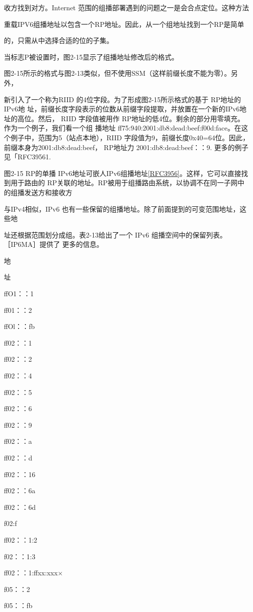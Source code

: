 收方找到对方。Internet 范围的组播部署遇到的问题之一是会合点定位。这种方法

重载IPV6组播地址以包含一个RP地址。因此，从一个组地址找到一个RP是简单

的，只需从中选择合适的位的子集。

当标志P被设置时，图2-15显示了组播地址修改后的格式。

图2-15所示的格式与图2-13类似，但不使用SSM（这样前缀长度不能为零）。另外，

新引入了一个称为RIID 的4位字段。为了形成图2-15所示格式的基于 RP地址的IPv6地
址，前缀长度字段表示的位数从前缀字段提取，并放置在一个新的IPv6地址的高位。然后，
RIID 字段值被用作 RP地址的低4位。剩余的部分用零填充。作为一个例子，我们看一个组
播地址 ff75:940:2001:db8:dead:beef:f00d:face。在这个例子中，范围为5（站点本地），RIID
字段值为9，前缀长度0x40=64位。因此，前缀本身为2001:db8:dead:beef， RP地址力
2001:db8:dead:beef：：9. 更多的例子见「RFC39561.


图2-15 RP的单播 IPv6地址可嵌人IPv6组播地址\href{https://www.rfc-editor.org/rfc/rfc3956}{[RFC3956]}。这样，它可以直接找到用于路由的
RP关联的地址。RP被用于组播路由系统，以协调不在同一子网中的组播发送方和接收方

与IPv4相似，IPv6 也有一些保留的组播地址。除了前面提到的可变范围地址，这些地

址还根据范围划分成组。表2-13给出了一个 IPv6 组播空间中的保留列表。［IP6MA］提供了
更多的信息。

地

址

ffO1：：1

ff01：：2

ffOl：：fb

ff02：：1

ff02：：2

ff02：：4

ff02：：5

ff02：：6

ff02：：9

ff02：：a

ff02：：d

ff02：：16

ff02：：6a

ff02：：6d

f02:f

ff02：：1:2

f02：：1:3

ff02：：1:ffxx:xxx×

f05：：2

f05：：fb

